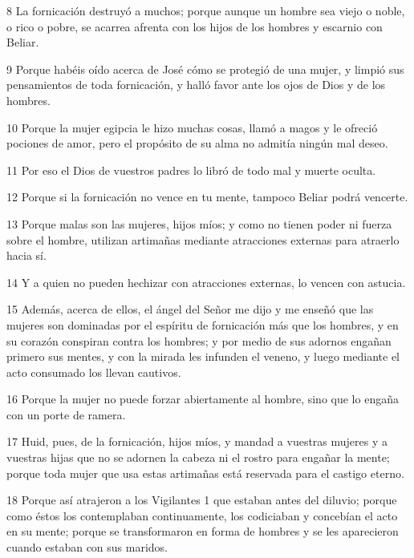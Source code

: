 \par 8 La fornicación destruyó a muchos; porque aunque un hombre sea viejo o noble, o rico o pobre, se acarrea afrenta con los hijos de los hombres y escarnio con Beliar.

\par 9 Porque habéis oído acerca de José cómo se protegió de una mujer, y limpió sus pensamientos de toda fornicación, y halló favor ante los ojos de Dios y de los hombres.

\par 10 Porque la mujer egipcia le hizo muchas cosas, llamó a magos y le ofreció pociones de amor, pero el propósito de su alma no admitía ningún mal deseo.

\par 11 Por eso el Dios de vuestros padres lo libró de todo mal y muerte oculta.

\par 12 Porque si la fornicación no vence en tu mente, tampoco Beliar podrá vencerte.

\par 13 Porque malas son las mujeres, hijos míos; y como no tienen poder ni fuerza sobre el hombre, utilizan artimañas mediante atracciones externas para atraerlo hacia sí.

\par 14 Y a quien no pueden hechizar con atracciones externas, lo vencen con astucia.

\par 15 Además, acerca de ellos, el ángel del Señor me dijo y me enseñó que las mujeres son dominadas por el espíritu de fornicación más que los hombres, y en su corazón conspiran contra los hombres; y por medio de sus adornos engañan primero sus mentes, y con la mirada les infunden el veneno, y luego mediante el acto consumado los llevan cautivos.

\par 16 Porque la mujer no puede forzar abiertamente al hombre, sino que lo engaña con un porte de ramera.

\par 17 Huid, pues, de la fornicación, hijos míos, y mandad a vuestras mujeres y a vuestras hijas que no se adornen la cabeza ni el rostro para engañar la mente; porque toda mujer que usa estas artimañas está reservada para el castigo eterno.

\par 18 Porque así atrajeron a los Vigilantes 1 que estaban antes del diluvio; porque como éstos los contemplaban continuamente, los codiciaban y concebían el acto en su mente; porque se transformaron en forma de hombres y se les aparecieron cuando estaban con sus maridos.

